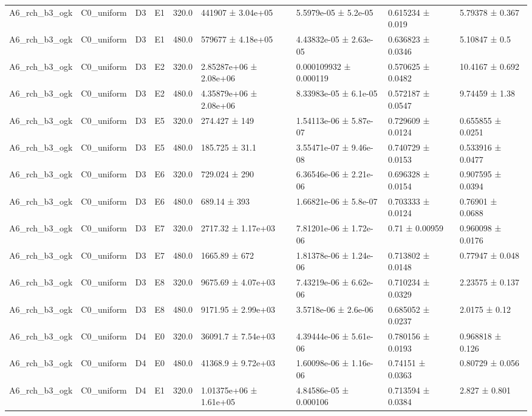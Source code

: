 \begin{table}
\begin{tabular}{lllllllll}
A6\_rch\_b3\_ogk & C0\_uniform & D3 & E1 & 320.0 & 441907 ± 3.04e+05 & 5.5979e-05 ± 5.2e-05 & 0.615234 ± 0.019 & 5.79378 ± 0.367 \\
A6\_rch\_b3\_ogk & C0\_uniform & D3 & E1 & 480.0 & 579677 ± 4.18e+05 & 4.43832e-05 ± 2.63e-05 & 0.636823 ± 0.0346 & 5.10847 ± 0.5 \\
A6\_rch\_b3\_ogk & C0\_uniform & D3 & E2 & 320.0 & 2.85287e+06 ± 2.08e+06 & 0.000109932 ± 0.000119 & 0.570625 ± 0.0482 & 10.4167 ± 0.692 \\
A6\_rch\_b3\_ogk & C0\_uniform & D3 & E2 & 480.0 & 4.35879e+06 ± 2.08e+06 & 8.33983e-05 ± 6.1e-05 & 0.572187 ± 0.0547 & 9.74459 ± 1.38 \\
A6\_rch\_b3\_ogk & C0\_uniform & D3 & E5 & 320.0 & 274.427 ± 149 & 1.54113e-06 ± 5.87e-07 & 0.729609 ± 0.0124 & 0.655855 ± 0.0251 \\
A6\_rch\_b3\_ogk & C0\_uniform & D3 & E5 & 480.0 & 185.725 ± 31.1 & 3.55471e-07 ± 9.46e-08 & 0.740729 ± 0.0153 & 0.533916 ± 0.0477 \\
A6\_rch\_b3\_ogk & C0\_uniform & D3 & E6 & 320.0 & 729.024 ± 290 & 6.36546e-06 ± 2.21e-06 & 0.696328 ± 0.0154 & 0.907595 ± 0.0394 \\
A6\_rch\_b3\_ogk & C0\_uniform & D3 & E6 & 480.0 & 689.14 ± 393 & 1.66821e-06 ± 5.8e-07 & 0.703333 ± 0.0124 & 0.76901 ± 0.0688 \\
A6\_rch\_b3\_ogk & C0\_uniform & D3 & E7 & 320.0 & 2717.32 ± 1.17e+03 & 7.81201e-06 ± 1.72e-06 & 0.71 ± 0.00959 & 0.960098 ± 0.0176 \\
A6\_rch\_b3\_ogk & C0\_uniform & D3 & E7 & 480.0 & 1665.89 ± 672 & 1.81378e-06 ± 1.24e-06 & 0.713802 ± 0.0148 & 0.77947 ± 0.048 \\
A6\_rch\_b3\_ogk & C0\_uniform & D3 & E8 & 320.0 & 9675.69 ± 4.07e+03 & 7.43219e-06 ± 6.62e-06 & 0.710234 ± 0.0329 & 2.23575 ± 0.137 \\
A6\_rch\_b3\_ogk & C0\_uniform & D3 & E8 & 480.0 & 9171.95 ± 2.99e+03 & 3.5718e-06 ± 2.6e-06 & 0.685052 ± 0.0237 & 2.0175 ± 0.12 \\
A6\_rch\_b3\_ogk & C0\_uniform & D4 & E0 & 320.0 & 36091.7 ± 7.54e+03 & 4.39444e-06 ± 5.61e-06 & 0.780156 ± 0.0193 & 0.968818 ± 0.126 \\
A6\_rch\_b3\_ogk & C0\_uniform & D4 & E0 & 480.0 & 41368.9 ± 9.72e+03 & 1.60098e-06 ± 1.16e-06 & 0.74151 ± 0.0363 & 0.80729 ± 0.056 \\
A6\_rch\_b3\_ogk & C0\_uniform & D4 & E1 & 320.0 & 1.01375e+06 ± 1.61e+05 & 4.84586e-05 ± 0.000106 & 0.713594 ± 0.0384 & 2.827 ± 0.801 \\

\end{tabular}
\end{table}
